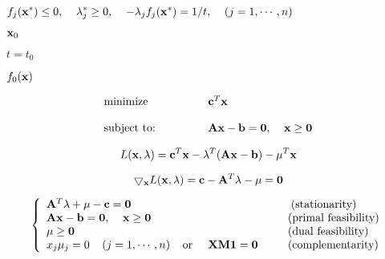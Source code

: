 {\newpage\clearpage
{}%
$\displaystyle f_j({\bf x}^*)\le 0,\;\;\;\;\lambda^*_j\ge 0,\;\;\;\;
  -\lambda_j f_j({\bf x}^*)=1/t,\;\;\;\;(j=1,\cdots,n)$%
\lthtmlindisplaymathZ
\lthtmlcheckvsize\clearpage}

{\newpage\clearpage
{}%
${\bf x}_0$%
\lthtmlinlinemathZ
\lthtmlcheckvsize\clearpage}

{\newpage\clearpage
{}%
$t=t_0$%
\lthtmlinlinemathZ
\lthtmlcheckvsize\clearpage}

{\newpage\clearpage
{}%
$f_0({\bf x})$%
\lthtmlinlinemathZ
\lthtmlcheckvsize\clearpage}

{\newpage\clearpage
{}%
\begin{displaymath}
  \begin{array}{ll}
    \mbox{minimize}  &  {\bf c}^T{\bf x}\\
    \;\;\;\;\;\;\;\;\;\;\;\;\;\;\;\;\;\;\;\;\;\;\;\;\;\;\;\;\;\;\\
    \mbox{subject to:} & {\bf Ax}-{\bf b}={\bf0},\;\;\;\;{\bf x}\ge{\bf0}
  \end{array}
\end{displaymath}%
\lthtmldisplayZ
\lthtmlcheckvsize\clearpage}

{\newpage\clearpage
{}%
\begin{displaymath}
L({\bf x},{\bf\lambda})={\bf c}^T{\bf x}-{\bf\lambda}^T({\bf Ax}-{\bf b})
-{\bf\mu}^T{\bf x}
\end{displaymath}%
\lthtmldisplayZ
\lthtmlcheckvsize\clearpage}

{\newpage\clearpage
{}%
\begin{displaymath}
\bigtriangledown_{\bf x} L({\bf x},{\bf\lambda})
={\bf c}-{\bf A}^T{\bf\lambda}-{\bf\mu}={\bf0}
\end{displaymath}%
\lthtmldisplayZ
\lthtmlcheckvsize\clearpage}

{\newpage\clearpage
{}%
\begin{displaymath}
\left\{\begin{array}{ll}
{\bf A}^T{\bf\lambda}+{\bf\mu}-{\bf c}={\bf0}&
\;\;\;\;\;\;\;\mbox{(stationarity)}\\
{\bf Ax}-{\bf b}={\bf0},\;\;\;\;{\bf x}\ge{\bf0}&
\;\;\;\;\;\;\mbox{(primal feasibility)}\\
{\bf\mu}\ge{\bf0}&\;\;\;\;\;\;\mbox{(dual feasibility)}\\
x_j\mu_j=0\;\;\;\;(j=1,\cdots,n)\;\;\;\;\mbox{or}\;\;\;\;\;
{\bf X}{\bf M}{\bf 1}={\bf0}&\;\;\;\;\;\;\mbox{(complementarity)}
\end{array}\right.
\end{displaymath}%
\lthtmldisplayZ
\lthtmlcheckvsize\clearpage}


